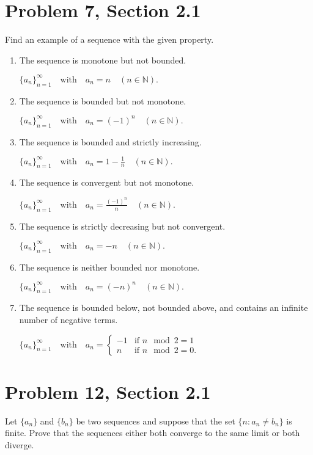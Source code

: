 \documentclass[12pt]{article}
\begin{document}
  \newpage



  \section*{Problem 7, Section 2.1}
  Find an example of a sequence with the given property.
  \begin{enumerate}[label=(\alph*)]
    \item The sequence is monotone but not bounded.
    
    $\{a_n\}_{n=1}^\infty\quad\text{with}\quad a_n = n\quad(n\in\mathbb{N}).$
    \item The sequence is bounded but not monotone. 
    
    $\{a_n\}_{n=1}^\infty\quad\text{with}\quad a_n = (-1)^n\quad(n\in\mathbb{N}).$
    \item The sequence is bounded and strictly increasing. 
    
    $\{a_n\}_{n=1}^\infty\quad\text{with}\quad a_n = 1-\frac{1}{n}\quad(n\in\mathbb{N}).$
    \item The sequence is convergent but not monotone. 
    
    $\{a_n\}_{n=1}^\infty\quad\text{with}\quad a_n = \frac{(-1)^n}{n}\quad(n\in\mathbb{N}).$
    \item The sequence is strictly decreasing but not convergent. 
    
    $\{a_n\}_{n=1}^\infty\quad\text{with}\quad a_n = -n\quad(n\in\mathbb{N}).$
    \item The sequence is neither bounded nor monotone.
    
    $\{a_n\}_{n=1}^\infty\quad\text{with}\quad a_n = (-n)^n\quad(n\in\mathbb{N}).$
    \item The sequence is bounded below, not bounded above, and contains an infinite number of negative terms.
    

    $\{a_n\}_{n=1}^\infty\quad\text{with}\quad a_n = \begin{cases} 
      -1 & \text{if } n \mod 2 = 1 \\
      n & \text{if } n \mod 2 = 0.
    \end{cases}$
  \end{enumerate}

  \newpage



  \section*{Problem 12, Section 2.1}
  Let $\{a_n\}$ and $\{b_n\}$ be two sequences and suppose that the set $\{n : a_n \neq b_n\}$ is finite. Prove that the sequences either both converge to the same limit or both diverge.
\end{document}

